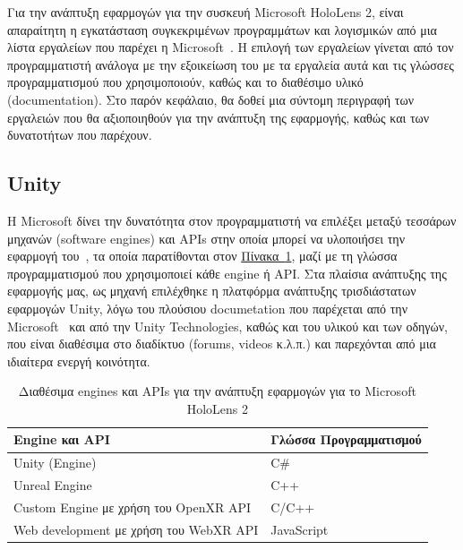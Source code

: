 Για την ανάπτυξη εφαρμογών για την συσκευή Microsoft HoloLens 2, είναι απαραίτητη η εγκατάσταση συγκεκριμένων προγραμμάτων και λογισμικών από μια λίστα εργαλείων που παρέχει η Microsoft~\cite{thetuvix_2023_install,qianw211_2022_choosing}. Η επιλογή των εργαλείων γίνεται από τον προγραμματιστή ανάλογα με την εξοικείωση του με τα εργαλεία αυτά και τις γλώσσες προγραμματισμού που χρησιμοποιούν, καθώς και το διαθέσιμο υλικό (documentation). Στο παρόν κεφάλαιο, θα δοθεί μια σύντομη περιγραφή των εργαλειών που θα αξιοποιηθούν για την ανάπτυξη της εφαρμογής, καθώς και των δυνατοτήτων που παρέχουν.

\subsection{Unity}
Η Microsoft δίνει την δυνατότητα στον προγραμματιστή να επιλέξει μεταξύ τεσσάρων μηχανών (software engines) και APIs στην οποία μπορεί να υλοποιήσει την εφαρμογή του~\cite{qianw211_2022_choosing}, τα οποία παρατίθονται στον \hyperref[table:enginesAndApi]{Πίνακα~\ref*{table:enginesAndApi}}, μαζί με τη γλώσσα προγραμματισμού που χρησιμοποιεί κάθε engine ή API\@. Στα πλαίσια ανάπτυξης της εφαρμογής μας, ως μηχανή επιλέχθηκε η πλατφόρμα ανάπτυξης τρισδιάστατων εφαρμογών Unity, λόγω του πλούσιου documetation που παρέχεται από την Microsoft~\cite{qianw211_2022_unity} και από την Unity Technologies, καθώς και του υλικού και των οδηγών, που είναι διαθέσιμα στο διαδίκτυο (forums, videos κ.λ.π.) και παρεχόνται από μια ιδιαίτερα ενεργή κοινότητα.

\begin{table}[!ht]
    \caption{Διαθέσιμα engines και APIs για την ανάπτυξη εφαρμογών για το Microsoft HoloLens 2}\label{table:enginesAndApi}
    \begin{tabularx}{\textwidth}{|X|X|} %
        \hline
        \textbf{Engine και API} & \textbf{Γλώσσα Προγραμματισμού} \\
        \hline
        Unity (Engine) & C\# \\
        \hline
        Unreal Engine & C++ \\
        \hline
        Custom Engine με χρήση του OpenXR API & C/C++ \\
        \hline
        Web development με χρήση του WebXR API & JavaScript \\
        \hline
    \end{tabularx}
\end{table}

